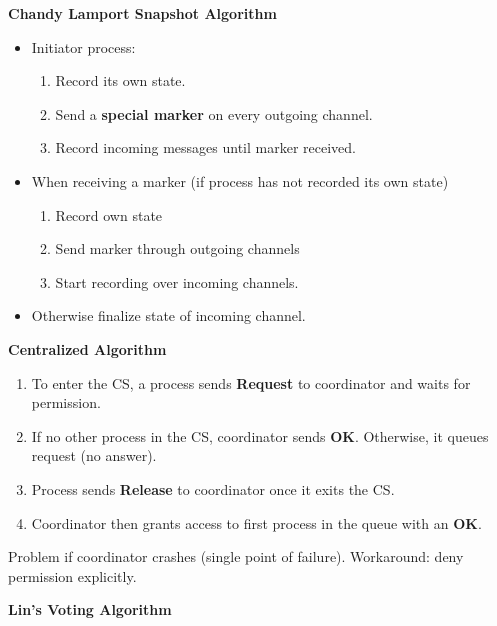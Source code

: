 \documentclass[a4paper, 10pt, twocolumn]{article}
\begin{document}
    \textbf{Chandy Lamport Snapshot Algorithm}

    \begin{itemize}
        \item Initiator process:
        \begin{enumerate}
            \item Record its own state.
            \item Send a \textbf{special marker} on every outgoing channel.
            \item Record incoming messages until marker received.
        \end{enumerate}
        \item When receiving a marker (if process has not recorded its own state)
        \begin{enumerate}
            \item Record own state
            \item Send marker through outgoing channels
            \item Start recording over incoming channels.
        \end{enumerate}
        \item Otherwise finalize state of incoming channel.
    \end{itemize}

    \textbf{Centralized Algorithm}

    \begin{enumerate}
        \item To enter the CS, a process sends \textbf{Request} to coordinator and waits for permission.
        \item If no other process in the CS, coordinator sends \textbf{OK}.
            Otherwise, it queues request (no answer).
        \item Process sends \textbf{Release} to coordinator once it exits the CS.
        \item Coordinator then grants access to first process in the queue with an \textbf{OK}.
    \end{enumerate}
    Problem if coordinator crashes (single point of failure).
    Workaround: deny permission explicitly.

    \textbf{Lin's Voting Algorithm}
    
\end{document}
